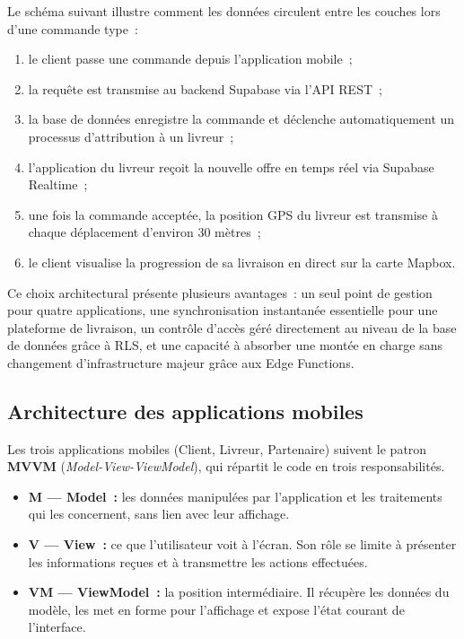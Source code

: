 \documentclass[12pt,fleqn,a4paper]{report}
\begin{document}
\begin{justify}
Le schéma suivant illustre comment les données circulent entre les couches lors d'une commande type~:

\begin{enumerate}
    \item le client passe une commande depuis l'application mobile~;
    \item la requête est transmise au backend Supabase via l'API REST~;
    \item la base de données enregistre la commande et déclenche automatiquement un processus d'attribution à un livreur~;
    \item l'application du livreur reçoit la nouvelle offre en temps réel via Supabase Realtime~;
    \item une fois la commande acceptée, la position GPS du livreur est transmise à chaque déplacement d'environ 30 mètres~;
    \item le client visualise la progression de sa livraison en direct sur la carte Mapbox.
\end{enumerate}

Ce choix architectural présente plusieurs avantages~: un seul point de gestion pour quatre applications, une synchronisation instantanée essentielle pour une plateforme de livraison, un contrôle d'accès géré directement au niveau de la base de données grâce à RLS, et une capacité à absorber une montée en charge sans changement d'infrastructure majeur grâce aux Edge Functions.

\subsection{Architecture des applications mobiles}

Les trois applications mobiles (Client, Livreur, Partenaire) suivent le patron \textbf{MVVM} (\textit{Model-View-ViewModel}), qui répartit le code en trois responsabilités.

\begin{itemize}
    \item \textbf{M — Model~:} les données manipulées par l'application et les traitements qui les concernent, sans lien avec leur affichage.
    \item \textbf{V — View~:} ce que l'utilisateur voit à l'écran. Son rôle se limite à présenter les informations reçues et à transmettre les actions effectuées.
    \item \textbf{VM — ViewModel~:} la position intermédiaire. Il récupère les données du modèle, les met en forme pour l'affichage et expose l'état courant de l'interface.
\end{itemize}


\end{justify}
\end{document}
